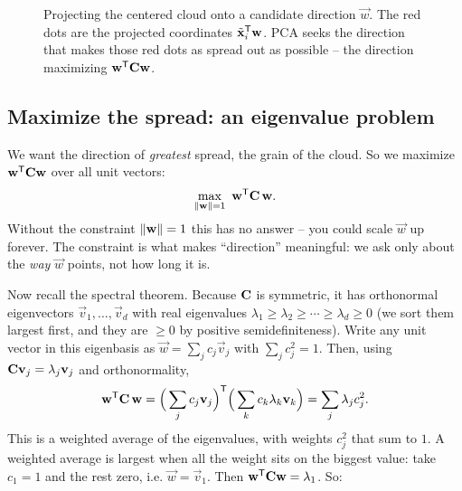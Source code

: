 \begin{figure}[H]
\centering
{}
\caption{Projecting the centered cloud onto a candidate direction $\vec w$. The red
dots are the projected coordinates $\tilde{\mathbf{x}}_i^{\mathsf{T}}\mathbf{w}$. PCA seeks the
direction that makes those red dots as spread out as possible -- the direction
maximizing $\mathbf{w}^{\mathsf{T}}\mathbf{C}\mathbf{w}$.}
\label{ch30:project}
\end{figure}

\subsection{Maximize the spread: an eigenvalue problem}

We want the direction of \emph{greatest} spread, the grain of the cloud. So we
maximize $\mathbf{w}^{\mathsf{T}}\mathbf{C}\mathbf{w}$ over all unit vectors:
\[
  \max_{\lVert\mathbf{w}\rVert=1}\ \mathbf{w}^{\mathsf{T}}\mathbf{C}\,\mathbf{w} .
\]
Without the constraint $\lVert\mathbf{w}\rVert=1$ this has no answer -- you could scale
$\vec w$ up forever. The constraint is what makes ``direction'' meaningful: we ask
only about the \emph{way} $\vec w$ points, not how long it is.

Now recall the spectral theorem. Because $\mathbf{C}$ is symmetric, it has orthonormal
eigenvectors $\vec v_1,\dots,\vec v_d$ with real eigenvalues
$\lambda_1\ge\lambda_2\ge\cdots\ge\lambda_d\ge0$ (we sort them largest first, and
they are $\ge 0$ by positive semidefiniteness). Write any unit vector in this
eigenbasis as $\vec w=\sum_j c_j\vec v_j$ with $\sum_j c_j^2=1$. Then, using
$\mathbf{C}\mathbf{v}_j=\lambda_j\mathbf{v}_j$ and orthonormality,
\[
  \mathbf{w}^{\mathsf{T}}\mathbf{C}\,\mathbf{w}
  =\Big(\sum_j c_j\mathbf{v}_j\Big)^{\mathsf{T}}\Big(\sum_k c_k\lambda_k\mathbf{v}_k\Big)
  =\sum_j \lambda_j c_j^2 .
\]
This is a weighted average of the eigenvalues, with weights $c_j^2$ that sum to $1$.
A weighted average is largest when all the weight sits on the biggest value: take
$c_1=1$ and the rest zero, i.e. $\vec w=\vec v_1$. Then $\mathbf{w}^{\mathsf{T}}\mathbf{C}\mathbf{w}=\lambda_1$. So:

